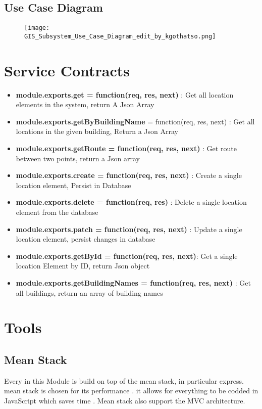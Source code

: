 \documentclass{article}
\begin{document}
	\subsection{Use Case Diagram}
		\begin{figure}[H]
			\texttt{[image: GIS\_Subsystem\_Use\_Case\_Diagram\_edit\_by\_kgothatso.png]}
		\end{figure}
	
\section{Service Contracts}
	
		\begin{itemize}
 			\item \textbf{module.exports.get = function(req, res, next)} : Get all location elements in the system, return A Json  Array
  			\item  \textbf{module.exports.getByBuildingName} = function(req, res, next) : Get all locations in the given building, Return a Json Array
  			\item \textbf{module.exports.getRoute = function(req, res, next)} : Get route between two points, return a Json array
  			\item \textbf{module.exports.create = function(req, res, next)} : Create a single location element, Persist in Database
  			\item \textbf{module.exports.delete = function(req, res)} : Delete a single location element from the database
  			\item \textbf{module.exports.patch = function(req, res, next)} : Update a single location element, persist changes in database
  			\item \textbf{module.exports.getById = function(req, res, next)}: Get a single location Element by ID, return Json object
			\item \textbf{module.exports.getBuildingNames = function(req, res, next)} : Get all buildings, return an array of building names
		\end{itemize}
\section{Tools}
	\subsection{Mean Stack}
		Every in this Module is build on top of the mean stack, in particular express. mean stack is chosen for its performance 
		. it allows for everything to be codded in JavaScript which saves time . Mean stack also support the MVC architecture.
\end{document}
